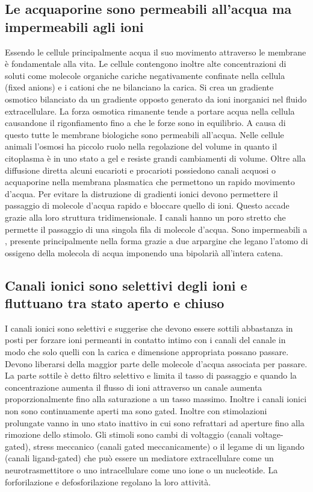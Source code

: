 \subsection{Le acquaporine sono permeabili all'acqua ma impermeabili agli ioni}
Essendo le cellule principalmente acqua il suo movimento attraverso le membrane \`e fondamentale alla vita. Le cellule contengono inoltre alte concentrazioni di soluti come molecole
organiche cariche negativamente confinate nella cellula (fixed anions) e i cationi che ne bilanciano la carica. Si crea un gradiente osmotico bilanciato da un gradiente opposto generato
da ioni inorganici nel fluido extracellulare. La forza osmotica rimanente tende a portare acqua nella cellula causandone il rigonfiamento fino a che le forze sono in equilibrio. A 
causa di questo tutte le membrane biologiche sono permeabili all'acqua. Nelle cellule animali l'osmosi ha piccolo ruolo nella regolazione del volume in quanto il citoplasma \`e in uno
stato a gel e resiste grandi cambiamenti di volume. Oltre alla diffusione diretta alcuni eucarioti e procarioti possiedono canali acquosi o acquaporine nella membrana plasmatica che
permettono un rapido movimento d'acqua. Per evitare la distruzione di gradienti ionici devono permettere il passaggio di molecole d'acqua rapido e bloccare quello di ioni. Questo accade
grazie alla loro struttura tridimensionale. I canali hanno un poro stretto che permette il passaggio di una singola fila di molecole d'acqua. Sono impermeabili a , presente 
principalmente nella forma  grazie a due arpargine che legano l'atomo di ossigeno della molecola di acqua imponendo una bipolari\`a all'intera catena. 
\subsection{Canali ionici sono selettivi degli ioni e fluttuano tra stato aperto e chiuso}
I canali ionici sono selettivi e suggerise che devono essere sottili abbastanza in posti per forzare ioni permeanti in contatto intimo con i canali del canale in modo che solo quelli
con la carica e dimensione appropriata possano passare. Devono liberarsi della maggior parte delle molecole d'acqua associata per passare. La parte sottile \`e detto filtro selettivo
e limita il tasso di passaggio e quando la concentrazione aumenta il flusso di ioni attraverso un canale aumenta proporzionalmente fino alla saturazione a un tasso massimo. Inoltre i 
canali ionici non sono continuamente aperti ma sono gated. Inoltre con stimolazioni prolungate vanno in uno stato inattivo in cui sono refrattari ad aperture fino alla rimozione dello
stimolo. Gli stimoli sono cambi di voltaggio (canali voltage-gated), stress meccanico (canali gated meccanicamente) o il legame di un ligando (canali ligand-gated) che pu\`o essere
un mediatore extracellulare come un neurotrasmettitore o uno intracellulare come uno ione o un nucleotide. La forforilazione e defosforilazione regolano la loro attivit\`a. 

